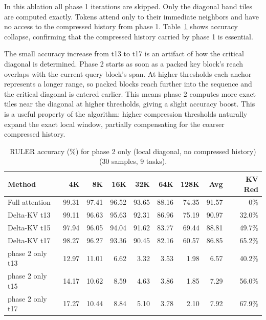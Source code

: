 In this ablation all phase 1 iterations are skipped. Only the diagonal band tiles are computed exactly. Tokens attend only to their immediate neighbors and have no access to the compressed history from phase 1. Table~\ref{tab:ablation_phase2only} shows accuracy collapse, confirming that the compressed history carried by phase 1 is essential.

The small accuracy increase from t13 to t17 is an artifact of how the critical diagonal is determined. Phase 2 starts as soon as a packed key block's reach overlaps with the current query block's span. At higher thresholds each anchor represents a longer range, so packed blocks reach further into the sequence and the critical diagonal is entered earlier. This means phase 2 computes more exact tiles near the diagonal at higher thresholds, giving a slight accuracy boost. This is a useful property of the algorithm: higher compression thresholds naturally expand the exact local window, partially compensating for the coarser compressed history.

\begin{table}[!ht]
\centering
\caption{RULER accuracy (\%) for phase 2 only (local diagonal, no compressed history) (30 samples, 9 tasks).}
\label{tab:ablation_phase2only}
\begin{tabular}{lrrrrrrrr}
\toprule
Method & 4K & 8K & 16K & 32K & 64K & 128K & Avg & KV Red \\
\midrule
Full attention                   & 99.31 & 97.41 & 96.52 & 93.65 & 88.16 & 74.35 & 91.57 & 0\%    \\
\midrule
Delta-KV t13               & 99.11 & 96.63 & 95.63 & 92.31 & 86.96 & 75.19 & 90.97 & 32.0\% \\
Delta-KV t15               & 97.94 & 96.05 & 94.04 & 91.62 & 83.77 & 69.44 & 88.81 & 49.7\% \\
Delta-KV t17               & 98.27 & 96.27 & 93.36 & 90.45 & 82.16 & 60.57 & 86.85 & 65.2\% \\
\midrule
phase 2 only t13                 & 12.97 & 11.01 &  6.62 &  3.32 &  3.53 &  1.98 &  6.57 & 40.2\% \\
phase 2 only t15                 & 14.17 & 10.62 &  8.59 &  4.63 &  3.86 &  1.85 &  7.29 & 56.0\% \\
phase 2 only t17                 & 17.27 & 10.44 &  8.84 &  5.10 &  3.78 &  2.10 &  7.92 & 67.9\% \\
\bottomrule
\end{tabular}
\end{table}

